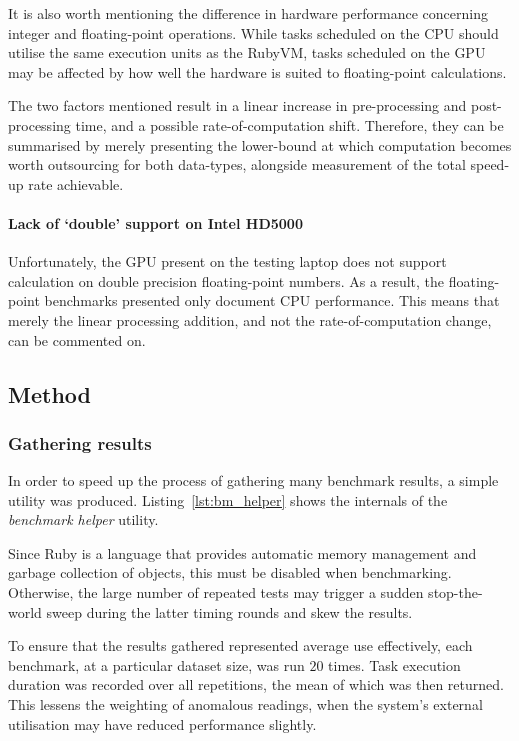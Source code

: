  It is also worth mentioning the difference in hardware performance concerning integer and floating-point operations. While tasks scheduled on the \ac{CPU} should utilise the same execution units as the RubyVM, tasks scheduled on the \ac{GPU} may be affected by how well the hardware is suited to floating-point calculations.

 The two factors mentioned result in a linear increase in pre-processing and post-processing time, and a possible rate-of-computation shift. Therefore, they can be summarised by merely presenting the lower-bound at which computation becomes worth outsourcing for both data-types, alongside measurement of the total speed-up rate achievable.

 \paragraph*{Lack of `double' support on Intel HD5000}
 Unfortunately, the \ac{GPU} present on the testing laptop does not support calculation on double precision floating-point numbers.
 As a result, the floating-point benchmarks presented only document \ac{CPU} performance. This means that merely the linear processing addition, and not the rate-of-computation change, can be commented on.

\subsection{Method}
\subsubsection{Gathering results}
In order to speed up the process of gathering many benchmark results, a simple utility was produced. Listing~\ref{lst:bm_helper} shows the internals of the \emph{benchmark helper} utility.

Since Ruby is a language that provides automatic memory management and garbage collection of objects, this must be disabled when benchmarking. Otherwise, the large number of repeated tests may trigger a sudden stop-the-world sweep during the latter timing rounds and skew the results.

To ensure that the results gathered represented average use effectively, each benchmark, at a particular dataset size,  was run $20$ times. Task execution duration was recorded over all repetitions, the mean of which was then returned. This lessens the weighting of anomalous readings, when the system's external utilisation may have reduced performance slightly.


